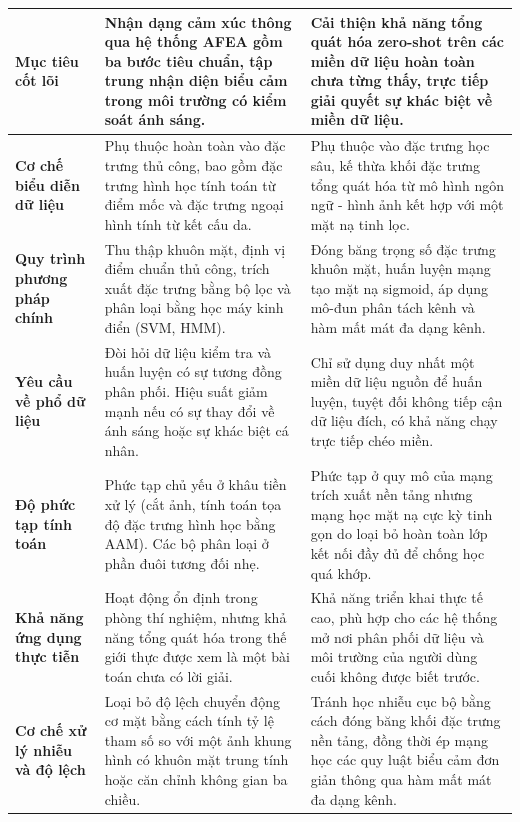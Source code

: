 \begin{longtable}{|p{}|p{}|p{}|}
    \textbf{Mục tiêu cốt lõi} & Nhận dạng cảm xúc thông qua hệ thống AFEA gồm ba bước tiêu chuẩn, tập trung nhận diện biểu cảm trong môi trường có kiểm soát ánh sáng. & Cải thiện khả năng tổng quát hóa zero-shot trên các miền dữ liệu hoàn toàn chưa từng thấy, trực tiếp giải quyết sự khác biệt về miền dữ liệu. \\
    \hline
    \textbf{Cơ chế biểu diễn dữ liệu} & Phụ thuộc hoàn toàn vào đặc trưng thủ công, bao gồm đặc trưng hình học tính toán từ điểm mốc và đặc trưng ngoại hình tính từ kết cấu da. & Phụ thuộc vào đặc trưng học sâu, kế thừa khối đặc trưng tổng quát hóa từ mô hình ngôn ngữ - hình ảnh kết hợp với một mặt nạ tinh lọc. \\
    \hline
    \textbf{Quy trình phương pháp chính} & Thu thập khuôn mặt, định vị điểm chuẩn thủ công, trích xuất đặc trưng bằng bộ lọc và phân loại bằng học máy kinh điển (SVM, HMM). & Đóng băng trọng số đặc trưng khuôn mặt, huấn luyện mạng tạo mặt nạ sigmoid, áp dụng mô-đun phân tách kênh và hàm mất mát đa dạng kênh. \\
    \hline
    \textbf{Yêu cầu về phổ dữ liệu} & Đòi hỏi dữ liệu kiểm tra và huấn luyện có sự tương đồng phân phối. Hiệu suất giảm mạnh nếu có sự thay đổi về ánh sáng hoặc sự khác biệt cá nhân. & Chỉ sử dụng duy nhất một miền dữ liệu nguồn để huấn luyện, tuyệt đối không tiếp cận dữ liệu đích, có khả năng chạy trực tiếp chéo miền. \\
    \hline
    \textbf{Độ phức tạp tính toán} & Phức tạp chủ yếu ở khâu tiền xử lý (cắt ảnh, tính toán tọa độ đặc trưng hình học bằng AAM). Các bộ phân loại ở phần đuôi tương đối nhẹ. & Phức tạp ở quy mô của mạng trích xuất nền tảng nhưng mạng học mặt nạ cực kỳ tinh gọn do loại bỏ hoàn toàn lớp kết nối đầy đủ để chống học quá khớp. \\
    \hline
    \textbf{Khả năng ứng dụng thực tiễn} & Hoạt động ổn định trong phòng thí nghiệm, nhưng khả năng tổng quát hóa trong thế giới thực được xem là một bài toán chưa có lời giải. & Khả năng triển khai thực tế cao, phù hợp cho các hệ thống mở nơi phân phối dữ liệu và môi trường của người dùng cuối không được biết trước. \\
    \hline
    \textbf{Cơ chế xử lý nhiễu và độ lệch} & Loại bỏ độ lệch chuyển động cơ mặt bằng cách tính tỷ lệ tham số so với một ảnh khung hình có khuôn mặt trung tính hoặc căn chỉnh không gian ba chiều. & Tránh học nhiễu cục bộ bằng cách đóng băng khối đặc trưng nền tảng, đồng thời ép mạng học các quy luật biểu cảm đơn giản thông qua hàm mất mát đa dạng kênh. \\
    
\end{longtable}

